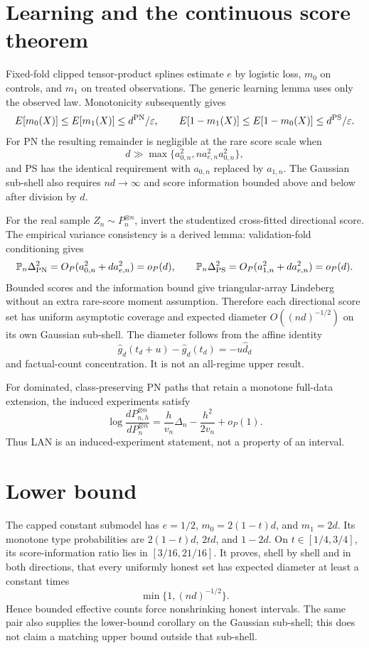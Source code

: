 \documentclass{article}
\begin{document}
\section{Learning and the continuous score theorem}
Fixed-fold clipped tensor-product splines estimate $e$ by logistic loss,
$m_0$ on controls, and $m_1$ on treated observations.  The generic learning
lemma uses only the observed law.  Monotonicity subsequently gives
\[
 E[m_0(X)]\leq E[m_1(X)]\leq d^{\rm PN}/\varepsilon,
 \qquad
 E[1-m_1(X)]\leq E[1-m_0(X)]\leq d^{\rm PS}/\varepsilon.
\]
For PN the resulting remainder is negligible at the rare score scale when
\[
 d\gg\max\{a_{0,n}^2,na_{e,n}^2a_{0,n}^2\},
\]
and PS has the identical requirement with $a_{0,n}$ replaced by $a_{1,n}$.
The Gaussian sub-shell also requires $nd\to\infty$ and score information
bounded above and below after division by $d$.

For the real sample $Z_n\sim P_n^{\otimes n}$, invert the studentized
cross-fitted directional score.  The empirical variance consistency is a
derived lemma: validation-fold conditioning gives
\[
 \mathbb P_n\Delta_{\rm PN}^2=O_P(a_{0,n}^2+da_{e,n}^2)=o_P(d),
 \qquad
 \mathbb P_n\Delta_{\rm PS}^2=O_P(a_{1,n}^2+da_{e,n}^2)=o_P(d).
\]
Bounded scores and the information bound give triangular-array Lindeberg
without an extra rare-score moment assumption.  Therefore each directional
score set has uniform asymptotic coverage and expected diameter
$O((nd)^{-1/2})$ on its own Gaussian sub-shell.  The diameter follows from
the affine identity
\[
 \widehat g_d(t_d+u)-\widehat g_d(t_d)=-u\widehat d_d
\]
and factual-count concentration.  It is not an all-regime upper result.

For dominated, class-preserving PN paths that retain a monotone full-data
extension, the induced experiments satisfy
\[
 \log\frac{dP_{n,h}^{\otimes n}}{dP_n^{\otimes n}}
 =\frac{h}{v_n}\Delta_n-\frac{h^2}{2v_n}+o_P(1).
\]
Thus LAN is an induced-experiment statement, not a property of an interval.

\section{Lower bound}
The capped constant submodel has $e=1/2$, $m_0=2(1-t)d$, and $m_1=2d$.
Its monotone type probabilities are $2(1-t)d$, $2td$, and $1-2d$.  On
$t\in[1/4,3/4]$, its score-information ratio lies in $[3/16,21/16]$.
It proves, shell by shell and in both directions, that every uniformly honest
set has expected diameter at least a constant times
\[
 \min\{1,(nd)^{-1/2}\}.
\]
Hence bounded effective counts force nonshrinking honest intervals.  The same
pair also supplies the lower-bound corollary on the Gaussian sub-shell; this
does not claim a matching upper bound outside that sub-shell.
\end{document}
